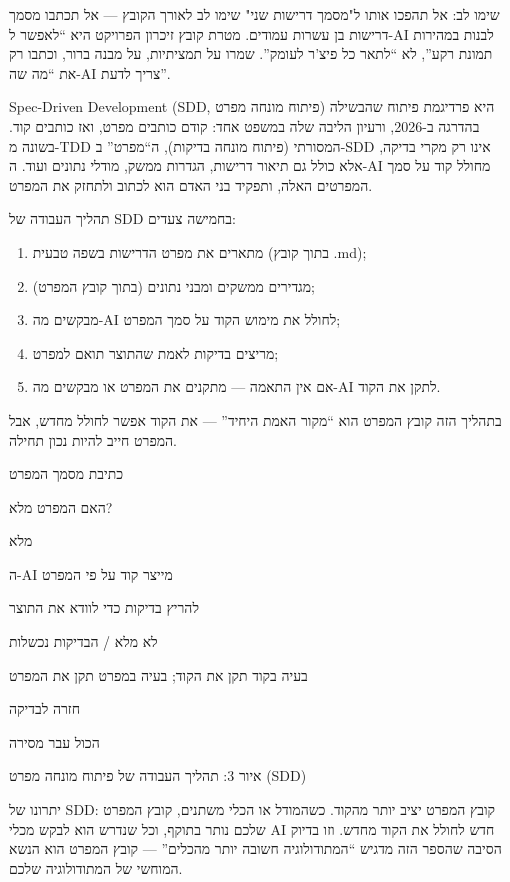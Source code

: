 \begin{tcbwarn}{שימו לב: אל תהפכו אותו ל"מסמך דרישות שני"}
שימו לב לאורך הקובץ — אל תכתבו מסמך דרישות בן עשרות עמודים. מטרת קובץ זיכרון הפרויקט היא “לאפשר ל-AI לבנות במהירות תמונת רקע”, לא “לתאר כל פיצ'ר לעומק”. שמרו על תמציתיות, על מבנה ברור, וכתבו רק את “מה שה-AI צריך לדעת”.

\end{tcbwarn}


Spec-Driven Development (SDD, פיתוח מונחה מפרט) היא פרדיגמת פיתוח שהבשילה בהדרגה ב-2026, ורעיון הליבה שלה במשפט אחד: קודם כותבים מפרט, ואז כותבים קוד. בשונה מ-TDD המסורתי (פיתוח מונחה בדיקות), ה“מפרט” ב-SDD אינו רק מקרי בדיקה, אלא כולל גם תיאור דרישות, הגדרות ממשק, מודלי נתונים ועוד. ה-AI מחולל קוד על סמך המפרטים האלה, ותפקיד בני האדם הוא לכתוב ולתחזק את המפרט.

תהליך העבודה של SDD בחמישה צעדים:

\begin{enumerate}
  \item מתארים את מפרט הדרישות בשפה טבעית (בתוך קובץ .md);
  \item מגדירים ממשקים ומבני נתונים (בתוך קובץ המפרט);
  \item מבקשים מה-AI לחולל את מימוש הקוד על סמך המפרט;
  \item מריצים בדיקות לאמת שהתוצר תואם למפרט;
  \item אם אין התאמה — מתקנים את המפרט או מבקשים מה-AI לתקן את הקוד.
\end{enumerate}

בתהליך הזה קובץ המפרט הוא “מקור האמת היחיד” — את הקוד אפשר לחולל מחדש, אבל המפרט חייב להיות נכון תחילה.

כתיבת מסמך המפרט

האם המפרט מלא?

מלא

ה-AI מייצר קוד על פי המפרט

להריץ בדיקות כדי לוודא את התוצר

לא מלא / הבדיקות נכשלות

בעיה בקוד תקן את הקוד; בעיה במפרט תקן את המפרט

חזרה לבדיקה

הכול עבר מסירה

\begin{center}\small\color{gray}איור 3: תהליך העבודה של פיתוח מונחה מפרט (SDD)\end{center}

יתרונו של SDD: קובץ המפרט יציב יותר מהקוד. כשהמודל או הכלי משתנים, קובץ המפרט שלכם נותר בתוקף, וכל שנדרש הוא לבקש מכלי AI חדש לחולל את הקוד מחדש. וזו בדיוק הסיבה שהספר הזה מדגיש “המתודולוגיה חשובה יותר מהכלים” — קובץ המפרט הוא הנשא המוחשי של המתודולוגיה שלכם.

